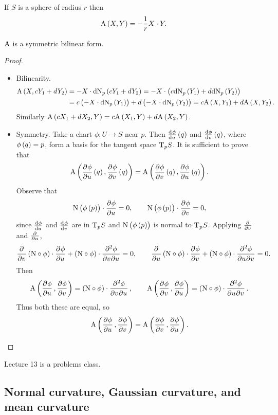 \begin{example*}
If $ S $ is a sphere of radius $ r $ then
$$ \A\br{X, Y} = -\dfrac{1}{r}X \cdot Y. $$
\end{example*}

\begin{proposition}
$ \mathrm{A} $ is a symmetric bilinear form.
\end{proposition}

\begin{proof}
\hfill
\begin{itemize}
\item Bilinearity.
\begin{align*}
\A\br{X, cY_1 + dY_2}
& = -X \cdot \d\N_p\br{cY_1 + dY_2}
= -X \cdot \br{c\d\N_p\br{Y_1} + d\d\N_p\br{Y_2}} \\
& = c\br{-X \cdot \d\N_p\br{Y_1}} + d\br{-X \cdot \d\N_p\br{Y_2}}
= c\A\br{X, Y_1} + d\A\br{X, Y_2}.
\end{align*}
Similarly $ \A\br{cX_1 + dX_2, Y} = c\A\br{X_1, Y} + d\A\br{X_2, Y} $.
\item Symmetry. Take a chart $ \phi : U \to S $ near $ p $. Then $ \tod{\phi}{u}\br{q} $ and $ \tod{\phi}{v}\br{q} $, where $ \phi\br{q} = p $, form a basis for the tangent space $ \mathrm{T}_p S $. It is sufficient to prove that
$$ \A\br{\dpd{\phi}{u}\br{q}, \dpd{\phi}{v}\br{q}} = \A\br{\dpd{\phi}{v}\br{q}, \dpd{\phi}{u}\br{q}}. $$
Observe that
$$ \N\br{\phi\br{p}} \cdot \dpd{\phi}{u} = 0, \qquad \N\br{\phi\br{p}} \cdot \dpd{\phi}{v} = 0, $$
since $ \tod{\phi}{u} $ and $ \tod{\phi}{v} $ are in $ \mathrm{T}_p S $ and $ \N\br{\phi\br{p}} $ is normal to $ \mathrm{T}_p S $. Applying $ \tpd{}{v} $ and $ \tpd{}{u} $,
$$ \dpd{}{v}\br{\N \circ \phi} \cdot \dpd{\phi}{u} + \br{\N \circ \phi} \cdot \dmd{\phi}{2}{v}{}{u}{} = 0, \qquad \dpd{}{u}\br{\N \circ \phi} \cdot \dpd{\phi}{v} + \br{\N \circ \phi} \cdot \dmd{\phi}{2}{u}{}{v}{} = 0. $$
Then
$$ \A\br{\dpd{\phi}{u}, \dpd{\phi}{v}} = \br{\N \circ \phi} \cdot \dmd{\phi}{2}{v}{}{u}{}, \qquad \A\br{\dpd{\phi}{v}, \dpd{\phi}{u}} = \br{\N \circ \phi} \cdot \dmd{\phi}{2}{u}{}{v}{}. $$
Thus both these are equal, so
$$ \A\br{\dpd{\phi}{u}, \dpd{\phi}{v}} = \A\br{\dpd{\phi}{v}, \dpd{\phi}{u}}. $$
\end{itemize}
\end{proof}


Lecture 13 is a problems class.

\pagebreak

\subsection{Normal curvature, Gaussian curvature, and mean curvature}

